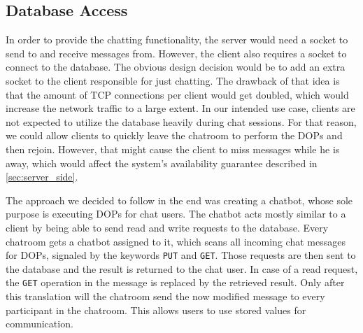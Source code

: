 \subsection{Database Access}
\label{sec:groupchat_chatbot}
In order to provide the chatting functionality, the server would need a socket to send to and receive messages from. However, the client also requires a socket to connect to the database. The obvious design decision would be to add an extra socket to the client responsible for just chatting. The drawback of that idea is that the amount of TCP connections per client would get doubled, which would increase the network traffic to a large extent. In our intended use case, clients are not expected to utilize the database heavily during chat sessions. For that reason, we could allow clients to quickly leave the chatroom to perform the DOPs and then rejoin. However, that might cause the client to miss messages while he is away, which would affect the system's availability guarantee described in \ref{sec:server_side}.

The approach we decided to follow in the end was creating a chatbot, whose sole purpose is executing DOPs for chat users. The chatbot acts mostly similar to a client by being able to send read and write requests to the database. Every chatroom gets a chatbot assigned to it, which scans all incoming chat messages for DOPs, signaled by the keywords \texttt{PUT} and \texttt{GET}. Those requests are then sent to the database and the result is returned to the chat user. In case of a read request, the \texttt{GET} operation in the message is replaced by the retrieved result. Only after this translation will the chatroom send the now modified message to every participant in the chatroom. This allows users to use stored values for communication.